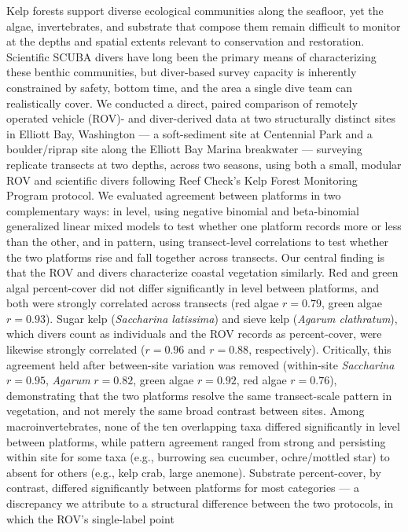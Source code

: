 \documentclass[11pt]{article}
\begin{document}
Kelp forests support diverse ecological communities along the seafloor, yet
the algae, invertebrates, and substrate that compose them remain difficult to
monitor at the depths and spatial extents relevant to conservation and
restoration.
Scientific SCUBA divers have long been the primary means of characterizing
these benthic communities, but diver-based survey capacity is inherently
constrained by safety, bottom time, and the area a single dive team can
realistically cover.
We conducted a direct, paired comparison of remotely operated vehicle
(ROV)- and diver-derived data at two structurally distinct sites in Elliott
Bay, Washington --- a soft-sediment site at Centennial Park and a
boulder/riprap site along the Elliott Bay Marina breakwater --- surveying
replicate transects at two depths, across two seasons, using both a small,
modular ROV and scientific divers following Reef Check's Kelp Forest
Monitoring Program protocol.
We evaluated agreement between platforms in two complementary ways: in level,
using negative binomial and beta-binomial generalized linear mixed models to
test whether one platform records more or less than the other, and in
pattern, using transect-level correlations to test whether the two platforms
rise and fall together across transects.
Our central finding is that the ROV and divers characterize coastal vegetation
similarly.
Red and green algal percent-cover did not differ significantly in level
between platforms, and both were strongly correlated across transects (red
algae $r=0.79$, green algae $r=0.93$).
Sugar kelp (\textit{Saccharina latissima}) and sieve kelp (\textit{Agarum
clathratum}), which divers count as individuals and the ROV records as
percent-cover, were likewise strongly correlated ($r=0.96$ and $r=0.88$,
respectively).
Critically, this agreement held after between-site variation was removed
(within-site \textit{Saccharina} $r=0.95$, \textit{Agarum} $r=0.82$, green
algae $r=0.92$, red algae $r=0.76$), demonstrating that the two platforms
resolve the same transect-scale pattern in vegetation, and not merely the
same broad contrast between sites.
Among macroinvertebrates, none of the ten overlapping taxa differed
significantly in level between platforms, while pattern agreement ranged from
strong and persisting within site for some taxa (e.g., burrowing sea cucumber,
ochre/mottled star) to absent for others (e.g., kelp crab, large anemone).
Substrate percent-cover, by contrast, differed significantly between
platforms for most categories --- a discrepancy we attribute to a structural
difference between the two protocols, in which the ROV's single-label point
\end{document}
